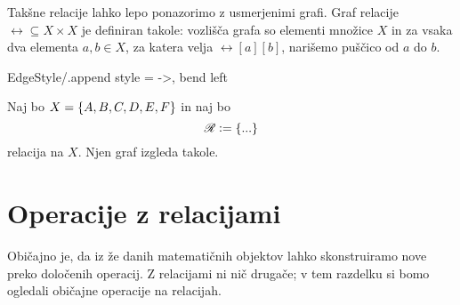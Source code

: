                 Takšne relacije lahko lepo ponazorimo z usmerjenimi grafi. Graf relacije $\rel \subseteq X \times X$ je definiran takole: vozlišča grafa so elementi množice $X$ in za vsaka dva elementa $a, b \in X$, za katera velja $\rel[a][b]$, narišemo puščico od $a$ do $b$.

                \GraphInit[vstyle = Normal]
                \tikzset
                {
                        EdgeStyle/.append style = {->, bend left}
                }

                \begin{zgled}\label{zgled:graf-relacije}
                        Naj bo $X = \set{A, B, C, D, E, F}$ in naj bo
                        \[\rel \dfeq \set{...}\]
                        relacija na $X$. Njen graf izgleda takole.

                \end{zgled}


        \section{Operacije z relacijami}\label{razdelek:operacije-z-relacijami}

                Običajno je, da iz že danih matematičnih objektov lahko skonstruiramo nove preko določenih operacij. Z relacijami ni nič drugače; v tem razdelku si bomo ogledali običajne operacije na relacijah.


